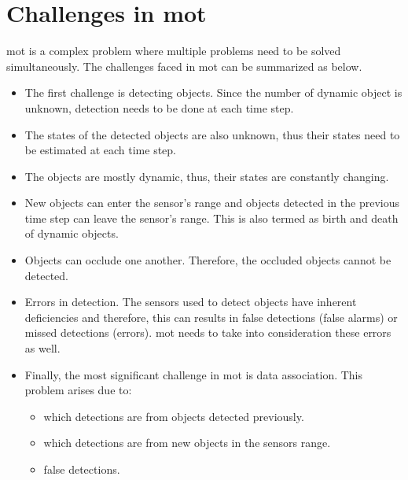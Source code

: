\documentclass[a4paper]{article}
\begin{document}
\section{Challenges in \acrfull{mot}}
\gls{mot} is a complex problem where multiple problems need to be solved simultaneously. The challenges faced in \gls{mot} can be summarized as below.
\begin{itemize}
	\item The first challenge is detecting objects. Since the number of dynamic object is unknown, detection needs to be done at each time step.
	\item The states of the detected objects are also unknown, thus their states need to be estimated at each time step.
	\item The objects are mostly dynamic, thus, their states are constantly changing.
	\item New objects can enter the sensor's range and objects detected in the previous time step can leave the sensor's range. This is also termed as birth and death of dynamic objects.
	\item Objects can occlude one another. Therefore, the occluded objects cannot be detected.
	\item Errors in detection. The sensors used to detect objects have inherent deficiencies and therefore, this can results in false detections (false alarms) or missed detections (errors). \gls{mot} needs to take into consideration these errors as well.
	\item Finally, the most significant challenge in \gls{mot} is data association. This problem arises due to:
	\begin{itemize}
		\item which detections are from objects detected previously.
		\item which detections are from new objects in the sensors range.
		\item false detections.
	\end{itemize}
\end{itemize}
\end{document}
